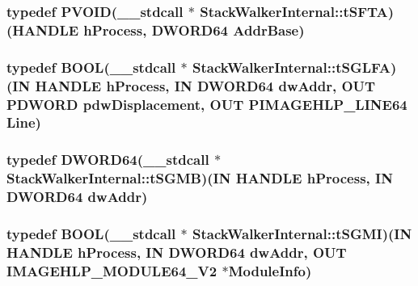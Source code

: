 \hypertarget{class_stack_walker_internal_afba034f54cdd3f3150457b66fa5d15c6}{
\subsubsection[{t\-S\-F\-T\-A}]{\setlength{\rightskip}{0pt plus 5cm}typedef P\-V\-O\-I\-D(\-\_\-\-\_\-stdcall $\ast$ Stack\-Walker\-Internal\-::t\-S\-F\-T\-A)(H\-A\-N\-D\-L\-E h\-Process, {\bf D\-W\-O\-R\-D64} Addr\-Base)}}\label{class_stack_walker_internal_afba034f54cdd3f3150457b66fa5d15c6}
\hypertarget{class_stack_walker_internal_a855cd4ed76c6a5f33bc2cf261ab44222}{
\subsubsection[{t\-S\-G\-L\-F\-A}]{\setlength{\rightskip}{0pt plus 5cm}typedef {\bf B\-O\-O\-L}(\-\_\-\-\_\-stdcall $\ast$ Stack\-Walker\-Internal\-::t\-S\-G\-L\-F\-A)(I\-N H\-A\-N\-D\-L\-E h\-Process, I\-N {\bf D\-W\-O\-R\-D64} dw\-Addr, O\-U\-T P\-D\-W\-O\-R\-D pdw\-Displacement, O\-U\-T {\bf P\-I\-M\-A\-G\-E\-H\-L\-P\-\_\-\-L\-I\-N\-E64} Line)}}\label{class_stack_walker_internal_a855cd4ed76c6a5f33bc2cf261ab44222}
\hypertarget{class_stack_walker_internal_a02d32f2ad652892dca2c319120d69743}{
\subsubsection[{t\-S\-G\-M\-B}]{\setlength{\rightskip}{0pt plus 5cm}typedef {\bf D\-W\-O\-R\-D64}(\-\_\-\-\_\-stdcall $\ast$ Stack\-Walker\-Internal\-::t\-S\-G\-M\-B)(I\-N H\-A\-N\-D\-L\-E h\-Process, I\-N {\bf D\-W\-O\-R\-D64} dw\-Addr)}}\label{class_stack_walker_internal_a02d32f2ad652892dca2c319120d69743}
\hypertarget{class_stack_walker_internal_abeffddcc7bdd828153da4176e53b84c8}{
\subsubsection[{t\-S\-G\-M\-I}]{\setlength{\rightskip}{0pt plus 5cm}typedef {\bf B\-O\-O\-L}(\-\_\-\-\_\-stdcall $\ast$ Stack\-Walker\-Internal\-::t\-S\-G\-M\-I)(I\-N H\-A\-N\-D\-L\-E h\-Process, I\-N {\bf D\-W\-O\-R\-D64} dw\-Addr, O\-U\-T {\bf I\-M\-A\-G\-E\-H\-L\-P\-\_\-\-M\-O\-D\-U\-L\-E64\-\_\-\-V2} $\ast$Module\-Info)}}\label{class_stack_walker_internal_abeffddcc7bdd828153da4176e53b84c8}
